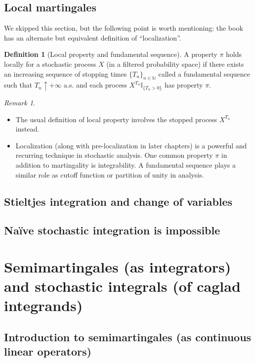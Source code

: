 \documentclass[openany,oneside]{book}
\theoremstyle{definition}
\newtheorem{defn}[thm]{Definition}
\theoremstyle{remark}
\newtheorem{rem}[thm]{Remark}
\newcommand{\I}{\mathbb{I}} %
\begin{document}
\section{Local martingales}
We skipped this section, but the following point is worth mentioning: the book has an alternate but equivalent definition of ``localization''.

\begin{defn}[Local property and fundamental sequence]
A property $\pi$ holds locally for a stochastic process $X$ (in a filtered probability space) if there exists an increasing sequence of stopping times $\{T_n\}_{n\in\mathbb{N}}$ called a fundamental sequence such that $T_n \uparrow +\infty$ a.s. and each process $X^{T_n} \I_{\{T_n >0\}}$ has property $\pi$. 
\end{defn}

\begin{rem}\
\begin{itemize}
\item The usual definition of local property involves the stopped process $X^{T_n}$ instead.
\item Localization (along with pre-localization in later chapters) is a powerful and recurring technique in stochastic analysis. One common property $\pi$ in addition to martingality is integrability. A fundamental sequence plays a similar role as cutoff function or partition of unity in analysis.
\end{itemize}
\end{rem}

\section{Stieltjes integration and change of variables}

\section{Na\"ive stochastic integration is impossible}



\chapter{Semimartingales (as integrators) and stochastic integrals (of caglad integrands)}

\section{Introduction to semimartingales (as continuous linear operators)}
\end{document}
